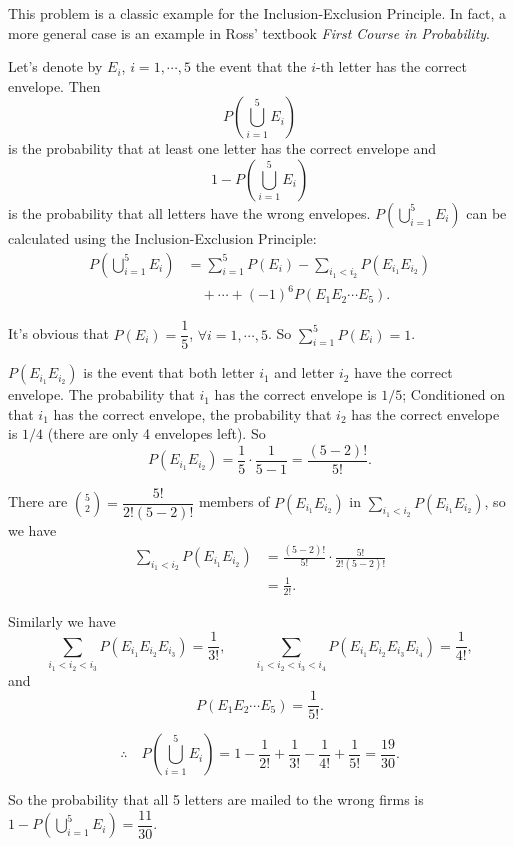 \begin{solution}
This problem is a classic example for the Inclusion-Exclusion Principle. In fact, a more
general case is an example in Ross' textbook \emph{First Course in Probability}.

Let's denote by $E_i$, $i=1,\cdots,5$ the event that the $i$-th letter has the correct envelope.
Then
\[
P\left(\bigcup_{i=1}^{5}E_i\right)
\]
is the probability that at least one letter has the correct envelope and
\[
1-P\left(\bigcup_{i=1}^{5}E_i\right)
\]
is the probability that all letters have the wrong envelopes. $P\left(\bigcup_{i=1}^{5}E_i\right)$
can be calculated using the Inclusion-Exclusion Principle:
\[
\begin{aligned}
P\left(\bigcup_{i=1}^{5}E_i\right)
&=\sum_{i=1}^{5}P(E_i)-\sum_{i_1<i_2}P(E_{i_1}E_{i_2})\\
&\quad+\cdots+(-1)^6P(E_1E_2\cdots E_5).
\end{aligned}
\]

It's obvious that $P(E_i)=\dfrac{1}{5}$, $\forall i=1,\cdots,5$. So
$\sum_{i=1}^{5}P(E_i)=1$.

$P(E_{i_1}E_{i_2})$ is the event that both letter $i_1$ and letter $i_2$ have the correct
envelope. The probability that $i_1$ has the correct envelope is $1/5$; Conditioned on that
$i_1$ has the correct envelope, the probability that $i_2$ has the correct envelope is $1/4$
(there are only 4 envelopes left). So
\[
P(E_{i_1}E_{i_2})=\frac{1}{5}\cdot\frac{1}{5-1}=\frac{(5-2)!}{5!}.
\]

There are $\binom{5}{2}=\dfrac{5!}{2!(5-2)!}$ members of $P(E_{i_1}E_{i_2})$ in
$\sum_{i_1<i_2}P(E_{i_1}E_{i_2})$, so we have
\[
\begin{aligned}
\sum_{i_1<i_2}P(E_{i_1}E_{i_2})
&=\frac{(5-2)!}{5!}\cdot\frac{5!}{2!(5-2)!}\\
&=\frac{1}{2!}.
\end{aligned}
\]

Similarly we have
\[
\sum_{i_1<i_2<i_3}P(E_{i_1}E_{i_2}E_{i_3})=\frac{1}{3!},
\qquad
\sum_{i_1<i_2<i_3<i_4}P(E_{i_1}E_{i_2}E_{i_3}E_{i_4})=\frac{1}{4!},
\]
and
\[
P(E_1E_2\cdots E_5)=\frac{1}{5!}.
\]



\[
\therefore\quad P\left(\bigcup_{i=1}^{5}E_i\right)=1-\frac{1}{2!}+\frac{1}{3!}-\frac{1}{4!}+\frac{1}{5!}=\frac{19}{30}.
\]

So the probability that all 5 letters are mailed to the wrong firms is
$1-P\left(\bigcup_{i=1}^{5}E_i\right)=\dfrac{11}{30}$.

\end{solution}

